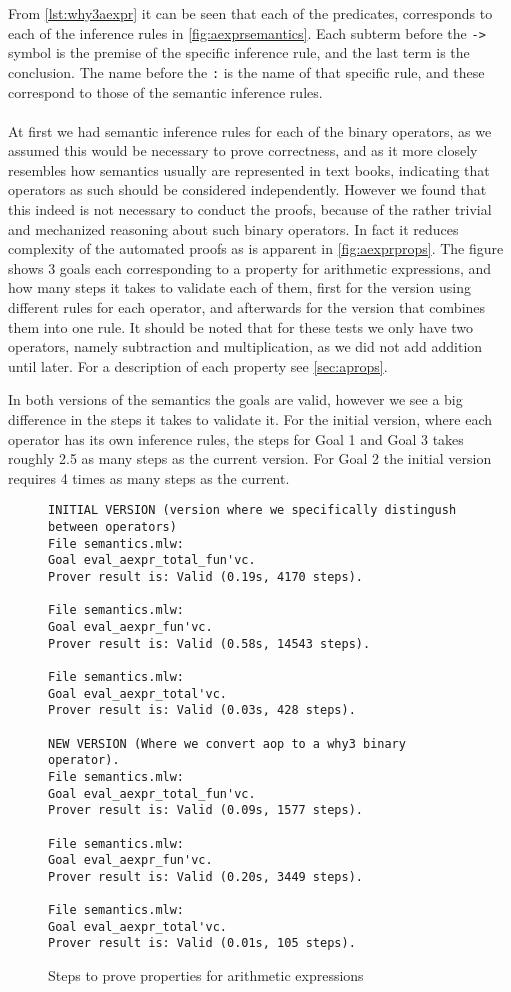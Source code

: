 From \autoref{lst:why3aexpr} it can be seen that each of the predicates, corresponds to
each of the inference rules in \autoref{fig:aexprsemantics}.
Each subterm before the \texttt{->} symbol is the premise of the specific inference rule, and the last term is the conclusion.
The name before the \texttt{:} is the name of that specific
rule, and these correspond to those of the semantic inference rules.
\\~\\
At first we had semantic inference rules for each of the binary operators, as we assumed this
would be necessary to prove correctness, and as it
more closely resembles how semantics usually are represented in text books, indicating that operators as such should be considered independently.
However we found that this indeed is not necessary to conduct the proofs, because of the rather
trivial and mechanized reasoning about such binary operators.
In fact it reduces complexity of the automated proofs as is apparent in \autoref{fig:aexprprops}.
The figure shows 3 goals each corresponding to a property for arithmetic expressions, and how
many steps it takes to validate each of them, first for the version using different rules for
each operator, and afterwards for the version that combines them into one rule.
It should be noted that for these tests we only have two operators, namely subtraction and
multiplication, as we did not add addition until later.
For a description of each property see \ref{sec:aprops}.

In both versions of the semantics the goals are valid, however we see a big difference in the steps it takes to validate it.
For the initial version, where each operator has its own inference rules, the steps for Goal 1 and Goal 3 takes roughly 2.5 as many steps as the current version.
For Goal 2 the initial version requires 4 times as many steps as the current.

\begin{figure}
\begin{lstlisting}
INITIAL VERSION (version where we specifically distingush between operators)
File semantics.mlw:
Goal eval_aexpr_total_fun'vc.
Prover result is: Valid (0.19s, 4170 steps).

File semantics.mlw:
Goal eval_aexpr_fun'vc.
Prover result is: Valid (0.58s, 14543 steps).

File semantics.mlw:
Goal eval_aexpr_total'vc.
Prover result is: Valid (0.03s, 428 steps).

NEW VERSION (Where we convert aop to a why3 binary operator).
File semantics.mlw:
Goal eval_aexpr_total_fun'vc.
Prover result is: Valid (0.09s, 1577 steps).

File semantics.mlw:
Goal eval_aexpr_fun'vc.
Prover result is: Valid (0.20s, 3449 steps).

File semantics.mlw:
Goal eval_aexpr_total'vc.
Prover result is: Valid (0.01s, 105 steps).

\end{lstlisting}
\caption{Steps to prove properties for arithmetic expressions}
\label{fig:aexprprops}
\end{figure}

